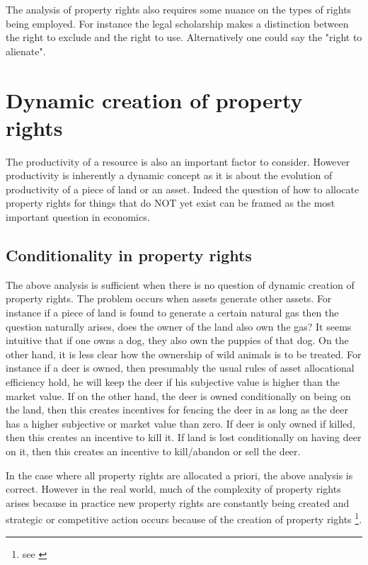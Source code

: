 \documentclass[12pt]{article}
\numberwithin{equation}{section}
\begin{document}
The analysis of property rights also requires some nuance on the types of rights being employed. For instance the legal scholarship makes a distinction between the right to exclude and the right to use. Alternatively one could say the "right to alienate". 

\newpage

\section{Dynamic creation of property rights}

The productivity of a resource is also an important factor to consider. However productivity is inherently a dynamic concept as it is about the evolution of productivity of a piece of land or an asset. Indeed the question of how to allocate property rights for things that do NOT yet exist can be framed as the most important question in economics. 



\subsection{Conditionality in property rights}

The above analysis is sufficient when there is no question of dynamic creation of property rights. The problem occurs when assets generate other assets. For instance if a piece of land is found to generate a certain natural gas then the question naturally arises, does the owner of the land also own the gas? It seems intuitive that if one owns a dog, they also own the puppies of that dog. On the other hand, it is less clear how the ownership of wild animals is to be treated. For instance if a deer is owned, then presumably the usual rules of asset allocational efficiency hold, he will keep the deer if his subjective value is higher than the market value. If on the other hand, the deer is owned conditionally on being on the land, then this creates incentives for fencing the deer in as long as the deer has a higher subjective or market value than zero. If deer is only owned if killed, then this creates an incentive to kill it. If land is lost conditionally on having deer on it, then this creates an incentive to kill/abandon or sell the deer. 

In the case where all property rights are allocated a priori, the above analysis is correct. However in the real world, much of the complexity of property rights arises because in practice new property rights are constantly being created and strategic or competitive action occurs because of the creation of property rights \footnote{see \cite{Alchian1973} }. 
\end{document}
